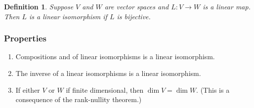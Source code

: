 \documentclass[12pt]{article}
\newtheorem{defn}{Definition}
\begin{document}
\begin{defn}
Suppose $V$ and $W$ are vector spaces and $L\colon V\to W$ is a linear map.  Then $L$ is a \emph{linear isomorphism} if $L$ is bijective.
\end{defn}

\subsubsection*{Properties}
\begin{enumerate}
\item Compositions and of linear isomorphisms is a linear isomorphism.
\item The inverse of a linear isomorphisms is a linear isomorphism.
\item If either $V$ or $W$ if finite dimensional, then $\dim V=\dim W$. 
(This is a consequence of the rank-nullity theorem.)

\end{enumerate}
\end{document}
